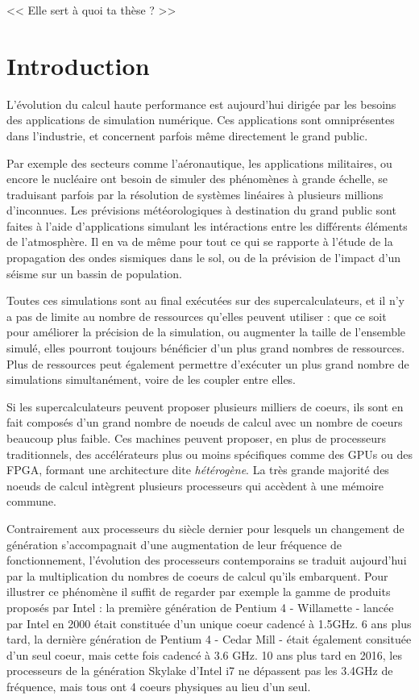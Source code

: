\begin{savequote}[6cm]
<< Elle sert à quoi ta thèse ?  >>

\end{savequote}
\chapter{Introduction}
\chaptertoc

L'évolution du calcul haute performance est aujourd'hui dirigée par les besoins des applications de simulation numérique.
Ces applications sont omniprésentes dans l'industrie, et concernent parfois même directement le grand public.

Par exemple des secteurs comme l'aéronautique, les applications militaires, ou encore le nucléaire ont besoin de simuler des phénomènes à grande échelle, se traduisant parfois par la résolution de systèmes linéaires à plusieurs millions d'inconnues.
Les prévisions météorologiques à destination du grand public sont faites à l'aide d'applications simulant les intéractions entre les différents éléments de l'atmosphère.
Il en va de même pour tout ce qui se rapporte à l'étude de la propagation des ondes sismiques dans le sol, ou de la prévision de l'impact d'un séisme sur un bassin de population.

Toutes ces simulations sont au final exécutées sur des supercalculateurs, et il n'y a pas de limite au nombre de ressources qu'elles peuvent utiliser : que ce soit pour améliorer la précision de la simulation, ou augmenter la taille de l'ensemble simulé, elles pourront toujours bénéficier d'un plus grand nombres de ressources.
Plus de ressources peut également permettre d'exécuter un plus grand nombre de simulations simultanément, voire de les coupler entre elles.

Si les supercalculateurs peuvent proposer plusieurs milliers de coeurs, ils sont en fait composés d'un grand nombre de noeuds de calcul avec un nombre de coeurs beaucoup plus faible.
Ces machines peuvent proposer, en plus de processeurs traditionnels, des accélérateurs plus ou moins spécifiques comme des GPUs ou des FPGA, formant une architecture dite \emph{hétérogène}.
La très grande majorité des noeuds de calcul intègrent plusieurs processeurs qui accèdent à une mémoire commune.

Contrairement aux processeurs du siècle dernier pour lesquels un changement de génération s'accompagnait d'une augmentation de leur fréquence de fonctionnement, l'évolution des processeurs contemporains se traduit aujourd'hui par la multiplication du nombres de coeurs de calcul qu'ils embarquent.
Pour illustrer ce phénomène il suffit de regarder par exemple la gamme de produits proposés par Intel : la première génération de Pentium 4 - Willamette - lancée par Intel en 2000 était constituée d'un unique coeur cadencé à 1.5GHz. 6 ans plus tard, la dernière génération de Pentium 4 - Cedar Mill - était également consituée d'un seul coeur, mais cette fois cadencé à 3.6 GHz. 10 ans plus tard en 2016, les processeurs de la génération Skylake d'Intel i7 ne dépassent pas les 3.4GHz de fréquence, mais tous ont 4 coeurs physiques au lieu d'un seul.

